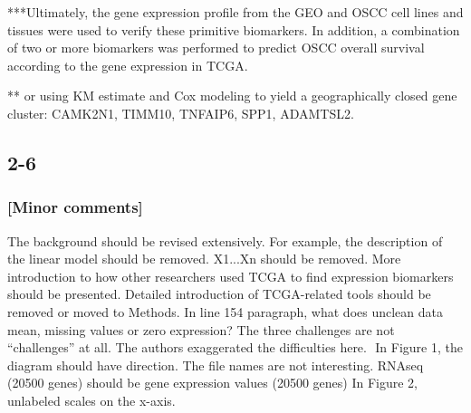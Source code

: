 \documentclass[preprint,12pt]{elsarticle}
\newenvironment{MyColorPar}[1]{%
    \leavevmode\color{#1}\ignorespaces%
}{%
}%
\begin{document}
\begin{MyColorPar}{blue}
 
***Ultimately, the gene expression profile from the GEO and OSCC cell lines and tissues were used to verify these primitive biomarkers. In addition, a combination of two or more biomarkers was performed to predict OSCC overall survival according to the gene expression in TCGA\cite{Huang2019}.

** or using %
KM estimate and Cox modeling to yield a geographically closed gene cluster:
CAMK2N1, TIMM10, TNFAIP6, SPP1, ADAMTSL2.

\end{MyColorPar}
%


\subsection*{2-6}
\subsubsection*{[Minor comments]}
The background should be revised extensively. For example, the description of the linear model should be removed. X1...Xn should be removed. 
More introduction to how other researchers used TCGA to find expression biomarkers should be presented. 
Detailed introduction of TCGA-related tools should be removed or moved to Methods.
In line 154 paragraph, what does unclean data mean, missing values or zero expression? The three challenges are not “challenges” at all. The authors exaggerated the difficulties here. 
In Figure 1, the diagram should have direction. 
The file names are not interesting. RNAseq (20500 genes) should be gene expression values (20500 genes)
In Figure 2, unlabeled scales on the x-axis.
\end{document}
